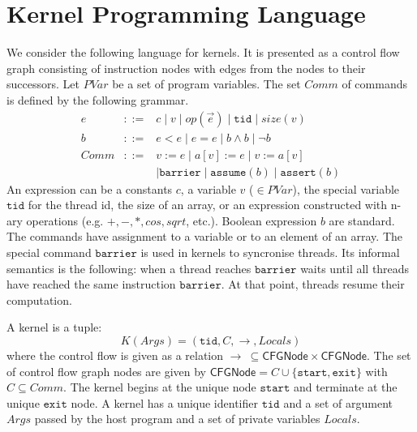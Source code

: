 \documentclass[a4paper,11pt]{llncs}
\newcommand{\tid}{\texttt{tid}}
\newcommand{\start}{\texttt{start}}
\newcommand{\exit}{\texttt{exit}}
\newcommand{\barrier}{\texttt{barrier}\xspace}
\newcommand{\vars}{\mathit{PVar}}
\begin{document}
\section{Kernel Programming Language}
\label{sec:progr-language}
We consider the following language for kernels.
It is presented as a control flow
graph consisting of instruction nodes with edges from the nodes to their successors.
Let $\vars$ be a set of program variables.
The set $Comm$ of commands is defined by the following grammar.
\[
\begin{array}{rcl}
	e & ::= & c \mid v \mid op (\stackrel{\rightarrow}{e}) \mid \tid \mid size(v) \\
	b & ::= & e  < e \mid e= e \mid  b \wedge b \mid  \neg b  \\
	Comm & ::= & v := e \mid a[v] := e \mid v := a[v] \\
	  &     & \mid \barrier \mid \texttt{assume}(b) \mid \texttt{assert}(b)
\end{array}
\]
An expression can be a constants $c$, a variable $v$ ($\in \vars$), the special variable $\tid$ for the thread id, the size of an array, or an expression constructed with n-ary operations (e.g. $+,-,*, cos, sqrt$, etc.).
Boolean expression $b$ are standard.
The commands have assignment to a variable or to an element of an array.
The special command $\barrier$ is used in kernels to syncronise threads.
Its informal semantics is the following: when a thread reaches $\barrier$ waits until all threads have reached the same instruction $\barrier$. At that point, threads resume their computation.\\

\newcommand{\Node}{\mathsf{CFGNode}}
\newcommand{\locals}{\mathit{Locals}}
\newcommand{\args}{\mathit{Args}}

\noindent
A kernel is a tuple: $$K(\args) = (\tid, C, \rightarrow, \locals)$$
where the control flow is given as a relation $\rightarrow\ \subseteq \Node \times \Node$. The set of control flow graph nodes are given by $\Node=C \cup \{ \start,\exit \}$ with $C \subseteq Comm$. The kernel begins at the
unique node $\start$ and terminate at the unique $\exit$ node.
A kernel has a unique identifier $\tid$ and a set of argument $\args$  passed by the host program and a set of private variables $\locals$.
\end{document}
